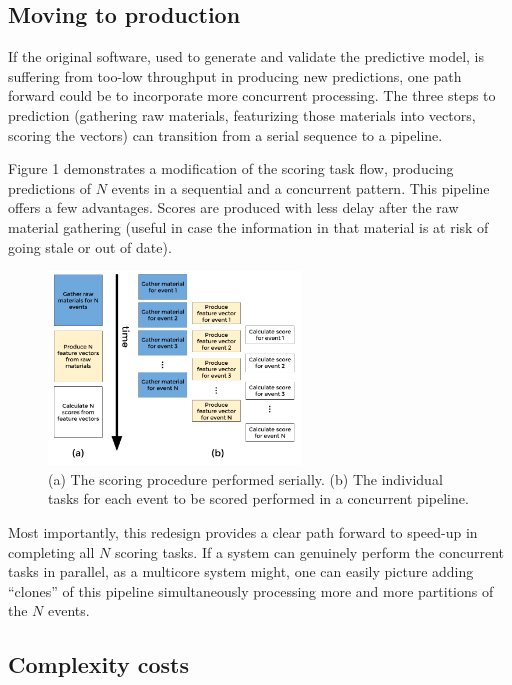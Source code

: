 \documentclass{article}
\begin{document}
\subsection{Moving to production}

If the original software, used to generate and validate the predictive model, is suffering from too-low throughput in producing new predictions, one path forward could be to incorporate more concurrent processing. The three steps to prediction (gathering raw materials, featurizing those materials into vectors, scoring the vectors) can transition from a serial sequence to a pipeline.

 Figure 1 demonstrates a modification of the scoring task flow, producing predictions of $N$ events in a sequential and a concurrent pattern.  This pipeline offers a few advantages. Scores are produced with less delay after the raw material gathering (useful in case the information in that material is at risk of going stale or out of date). 
 
 \begin{figure}[h]
\includegraphics[width=0.6\textwidth]{fig/tex/pipeline.png}
\centering
\caption{(a) The scoring procedure performed serially. (b) The individual tasks for each event to be scored performed in a concurrent pipeline.}
\end{figure}

Most importantly, this redesign provides a clear path forward to speed-up in completing all $N$ scoring tasks. If a system can genuinely perform the concurrent tasks in parallel, as a multicore system might, one can easily picture adding ``clones'' of this pipeline simultaneously processing more and more partitions of the $N$ events.

\subsection{Complexity costs}
\end{document}
